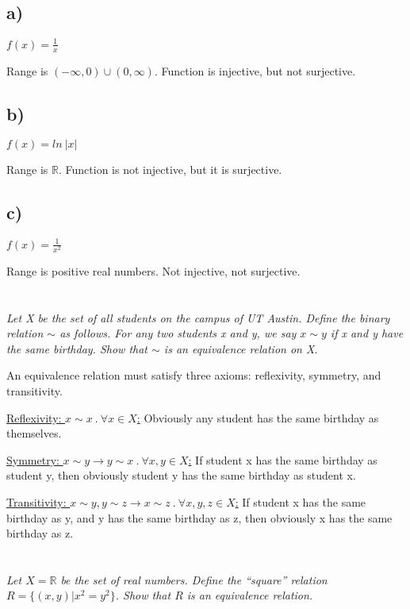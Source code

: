 \documentclass[]{article}
\newcommand{\reals}{\mathbb{R}}
\begin{document}
		\subsection*{a)}

			\textit{$f(x) = \frac{1}{x}$}

				Range is $(-\infty, 0) \cup (0, \infty)$. Function is injective, but not surjective. 

		\subsection*{b)}
			\textit{$f(x) = ln\ |x|$}

				Range is $\reals$. Function is not injective, but it is surjective.

		\subsection*{c)}
			\textit{$f(x) = \frac{1}{x^2}$}

				Range is positive real numbers. Not injective, not surjective. 

	\section{}
		\textit{Let X be the set of all students on the campus of UT Austin. Define the binary relation $\sim$ as follows. For any two students x and y, we say $x \sim y$ if x and y have the same birthday. Show that $\sim$ is an equivalence relation on X.}

			An equivalence relation must satisfy three axioms: reflexivity, symmetry, and transitivity.

			\underline{Reflexivity: $x \sim x\ .\ \forall x \in X$:} 
			Obviously any student has the same birthday as themselves. 

			\underline{Symmetry: $x \sim y \to y \sim x\ .\ \forall x, y \in X$:} 
			If student x has the same birthday as student y, then obviously student y has the same birthday as student x. 

			\underline{Transitivity: $x \sim y, y \sim z \to x \sim z\ .\ \forall x, y, z \in X$:} 
			If student x has the same birthday as y, and y has the same birthday as z, then obviously x has the same birthday as z. 

	\section{}
		\textit{Let $X = \reals$ be the set of real numbers. Define the ``square'' relation $R = \{(x, y) | x^2 = y^2\}$. Show that $R$ is an equivalence relation.}
\end{document}
